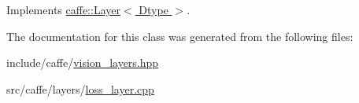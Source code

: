 Implements \hyperlink{classcaffe_1_1_layer_abd13c6489c13953b4fbcfcf6880835d0}{caffe\+::\+Layer$<$ Dtype $>$}.



The documentation for this class was generated from the following files\+:\begin{DoxyCompactItemize}
\item 
include/caffe/\hyperlink{vision__layers_8hpp}{vision\+\_\+layers.\+hpp}\item 
src/caffe/layers/\hyperlink{loss__layer_8cpp}{loss\+\_\+layer.\+cpp}\end{DoxyCompactItemize}
